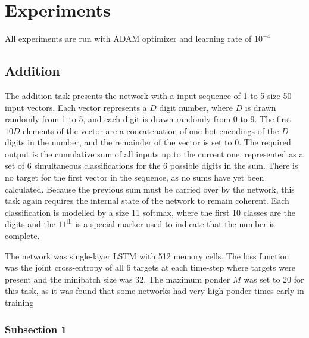 
\chapter{Experiments} %

\label{Chapter5} %

All experiments are run with ADAM optimizer and learning rate of \(10^{-4}\)
\section{Addition}

The addition task presents the network with a input sequence of 1 to 5 size 50 input vectors. Each vector represents a \(D\) digit number, where \(D\) is drawn randomly from 1 to 5, and each digit is drawn randomly from 0 to 9. The first \(10D\) elements of the vector are a concatenation of one-hot encodings of the \(D\) digits in the number,  and the remainder of the vector is set to 0.  The required output is the cumulative sum of all inputs up to the current one,  represented as a set of 6 simultaneous classifications  for  the  6  possible  digits  in  the  sum. There  is  no  target  for  the  first  vector  in  the  sequence, as no sums have yet been calculated.  Because the previous sum must be carried over by the network,  this task again requires the internal state of the network to remain coherent.  Each classification is modelled by a size 11 softmax, where the first 10 classes are the digits and the \(11^{\text{th}}\) is a special marker used to indicate that the number is complete.

The  network  was  single-layer  LSTM  with  512  memory  cells. The  loss  function  was  the  joint cross-entropy of all 6 targets at each time-step where targets were present and the minibatch size was 32. The maximum ponder \(M\) was set to 20 for this task, as it was found that some networks had very high ponder times early in training

\subsection{Subsection 1}

